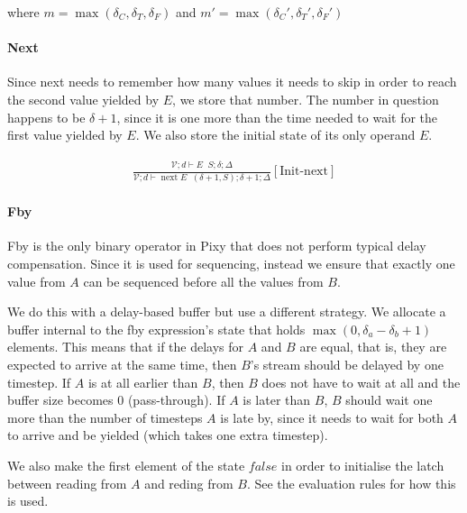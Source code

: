 \documentclass{scrartcl}
\DeclareMathOperator{\nextop}{next}
\DeclareMathOperator{\initrel}{\overset{init}{\Rightarrow}}
\begin{document}
    where $m = \max(\delta_C, \delta_T, \delta_F)$ and $m' = \max(\delta_C', \delta_T', \delta_F')$
    
    \paragraph{Next}
    
    Since next needs to remember how many values it needs to skip in order to reach the second value yielded by $E$, we store that number. The number in question happens to be $\delta+1$, since it is one more than the time needed to wait for the first value yielded by $E$. We also store the initial state of its only operand $E$.
    
    \begin{align*}
    \frac{
        \begin{matrix}
        \mathcal{V}; d \vdash E \initrel S; \delta; \Delta
        \end{matrix}
    }{
        \mathcal{V}; d \vdash \nextop E \initrel (\delta+1, S); \delta+1; \Delta
    }[\text{Init-next}]
    \end{align*}
    
    \paragraph{Fby}
    
    Fby is the only binary operator in Pixy that does not perform typical delay compensation. Since it is used for sequencing, instead we ensure that exactly one value from $A$ can be sequenced before all the values from $B$.
    
    We do this with a delay-based buffer but use a different strategy. We allocate a buffer internal to the fby expression's state that holds $\max(0, \delta_a - \delta_b +1)$ elements. This means that if the delays for $A$ and $B$ are equal, that is, they are expected to arrive at the same time, then $B$'s stream should be delayed by one timestep. If $A$ is at all earlier than $B$, then $B$ does not have to wait at all and the buffer size becomes $0$ (pass-through). If $A$ is later than $B$, $B$ should wait one more than the number of timesteps $A$ is late by, since it needs to wait for both $A$ to arrive and be yielded (which takes one extra timestep).
    
    We also make the first element of the state $false$ in order to initialise the latch between reading from $A$ and reding from $B$. See the evaluation rules for how this is used.
    
\end{document}
